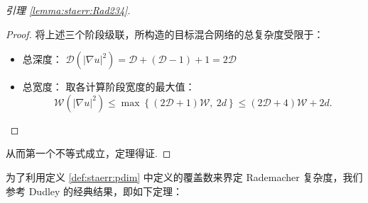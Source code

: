 \begin{proof}[引理 \ref{lemma:staerr:Rad234}]
\begin{proof}
将上述三个阶段级联，所构造的目标混合网络的总复杂度受限于：
\begin{itemize}
    \item 总深度： $\mathcal{D}\left(|\nabla u|^2\right) = \mathcal{D} + (\mathcal{D}-1) + 1 = 2\mathcal{D}$
    \item 总宽度： 取各计算阶段宽度的最大值：
    $$\mathcal{W}\left(|\nabla u|^2\right) \leq \max\left\{ (2\mathcal{D}+1)\mathcal{W}, \ 2d \right\} \leq (2\mathcal{D}+4)\mathcal{W} + 2d.$$
\end{itemize}
\end{proof}
从而第一个不等式成立，定理得证.
\end{proof}




为了利用定义 \ref{def:staerr:pdim} 中定义的覆盖数来界定 Rademacher 复杂度，我们参考 Dudley 的经典结果，即如下定理：

